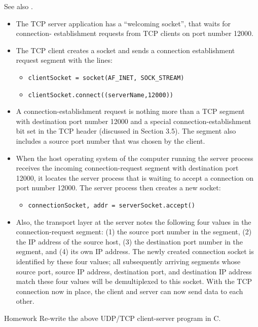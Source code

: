   See also .
  \begin{itemize}
  \item The TCP server application has a ``welcoming socket'', that waits for connection-
    establishment requests from TCP clients on port number 12000.
  \item The TCP client creates a socket and sends a connection establishment request
    segment with the lines:
    \begin{itemize}
    \item[] \texttt{clientSocket = socket(AF\_INET, SOCK\_STREAM)}
    \item[] \texttt{clientSocket.connect((serverName,12000))}
    \end{itemize}
  \item A connection-establishment request is nothing more than a TCP segment with
    destination port number 12000 and a special connection-establishment bit set in the
    TCP header (discussed in Section 3.5). The segment also
    includes a source port number that was chosen by the client.
  \item When the host operating system of the computer running the server process receives
    the incoming connection-request segment with destination port 12000, it locates the
    server process that is waiting to accept a connection on port number 12000. The server
    process then creates a new socket:
    \begin{itemize}
    \item[] \texttt{connectionSocket, addr = serverSocket.accept()} 
    \end{itemize}
  \item Also, the transport layer at the server notes the following four values in the
    connection-request segment: (1) the source port number in the segment, (2) the IP
    address of the source host, (3) the destination port number in the segment, and (4)
    its own IP address. The newly created connection socket is identified by these four
    values; all subsequently arriving segments whose source port, source IP address,
    destination port, and destination IP address match these four values will be
    demultiplexed to this socket. With the TCP connection now in place, the client and
    server can now send data to each other.
  \end{itemize}

  \begin{frame}{Homework}
    Re-write the above UDP/TCP client-server program in C.
  \end{frame}


